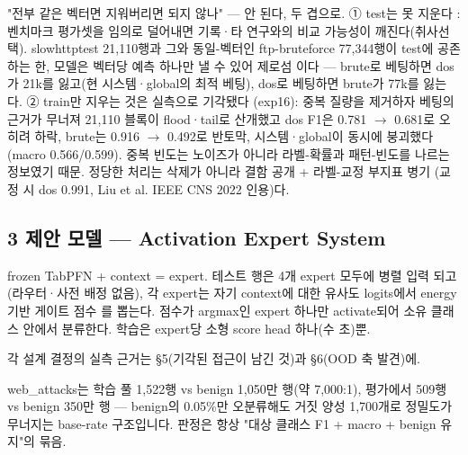 "전부 같은 벡터면 지워버리면 되지 않나" — 안 된다, 두 겹으로. ① test는 못 지운다 : 벤치마크 평가셋을 임의로 덜어내면 기록·타 연구와의 비교 가능성이 깨진다(취사선택). slowhttptest 21,110행과 그와 동일-벡터인 ftp-bruteforce 77,344행이 test에 공존하는 한, 모델은 벡터당 예측 하나만 낼 수 있어 제로섬 이다 — brute로 베팅하면 dos가 21k를 잃고(현 시스템·global의 최적 베팅), dos로 베팅하면 brute가 77k를 잃는다. ② train만 지우는 것은 실측으로 기각됐다 (exp16): 중복 질량을 제거하자 베팅의 근거가 무너져 21,110 블록이 flood·tail로 산개했고 dos F1은 0.781 \ensuremath{\rightarrow} 0.681로 오히려 하락, brute는 0.916 \ensuremath{\rightarrow} 0.492로 반토막, 시스템·global이 동시에 붕괴했다(macro 0.566/\allowbreak{}0.599). 중복 빈도는 노이즈가 아니라 라벨-확률과 패턴-빈도를 나르는 정보였기 때문. 정당한 처리는 삭제가 아니라 결함 공개 +\allowbreak{} 라벨-교정 부지표 병기 (교정 시 dos 0.991, Liu et al. IEEE CNS 2022 인용)다.

\subsection*{3 제안 모델 — Activation Expert System}
frozen TabPFN +\allowbreak{} context =\allowbreak{} expert. 테스트 행은 4개 expert 모두에 병렬 입력 되고 (라우터·사전 배정 없음), 각 expert는 자기 context에 대한 유사도 logits에서 energy 기반 게이트 점수 를 뽑는다. 점수가 argmax인 expert 하나만 activate되어 소유 클래스 안에서 분류한다. 학습은 expert당 소형 score head 하나(수 초)뿐.

각 설계 결정의 실측 근거는 §5(기각된 접근이 남긴 것)과 §6(OOD 축 발견)에.

web\_\allowbreak{}attacks는 학습 풀 1,522행 vs benign 1,050만 행(약 7,000:1), 평가에서 509행 vs benign 350만 행 — benign의 0.05\%만 오분류해도 거짓 양성 1,700개로 정밀도가 무너지는 base-rate 구조입니다. 판정은 항상 "대상 클래스 F1 +\allowbreak{} macro +\allowbreak{} benign 유지"의 묶음.

